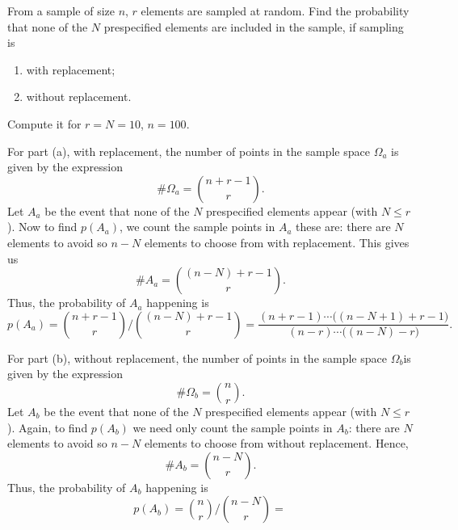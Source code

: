 \begin{problem}
  From a sample of size \(n\), \(r\) elements are sampled at random. Find
  the probability that none of the \(N\) prespecified elements are included
  in the sample, if sampling is
  \begin{enumerate}[label=(\alph*)]
  \item with replacement;
  \item without replacement.
  \end{enumerate}
  Compute it for \(r=N=10\), \(n=100\).
\end{problem}
\begin{solution}
  For part (a), with replacement, the number of points in the sample space
  \(\Omega_a\) is given by the expression
  \begin{equation}
    \label{eq:1-6}
    \#\Omega_a=\binom{n+r-1}{r}.
  \end{equation}
  Let \(A_a\) be the event that none of the \(N\) prespecified elements
  appear (with \(N\leq r\)). Now to find \(p(A_a)\), we count the sample
  points in \(A_a\) these are: there are \(N\) elements to avoid so \(n-N\)
  elements to choose from with replacement. This gives us
  \begin{equation}
    \label{eq:1-7}
    \#A_a=\binom{(n-N)+r-1}{r}.
  \end{equation}
  Thus, the probability of \(A_a\) happening is
  \[
    p(A_a)=
    \displaystyle\binom{n+r-1}{r}
    \biggl/
    \binom{(n-N)+r-1}{r}=
    \frac{(n+r-1)\dotsm\bigl((n-N+1)+r-1\bigr)}{(n-r)\dotsm\bigl((n-N)-r\bigr)}.
  \]

  For part (b), without replacement, the number of points in the sample
  space \(\Omega_b\)is given by the expression
  \begin{equation}
    \label{eq:1-8}
    \#\Omega_b=\binom{n}{r}.
  \end{equation}
  Let \(A_b\) be the event that none of the \(N\) prespecified elements
  appear (with \(N\leq r\)). Again, to find \(p(A_b)\) we need only count
  the sample points in \(A_b\): there are \(N\) elements to avoid so
  \(n-N\) elements to choose from without replacement. Hence,
  \begin{equation}
    \label{eq:1-9}
    \#A_b=
    \binom{n-N}{r}.
  \end{equation}
  Thus, the probability of \(A_b\) happening is
  \[
    p(A_b)=\binom{n}{r}\biggl/\binom{n-N}{r}=\frac{}{}
  \]
\end{solution}
\newpage

